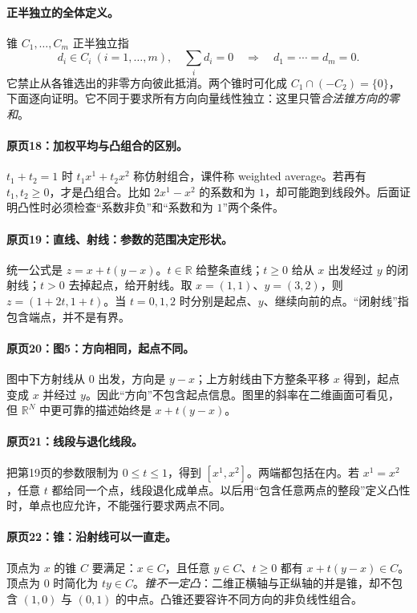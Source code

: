 \documentclass[11pt,a4paper]{article}
\newcommand{\R}{\mathbb{R}}\newcommand{\N}{\mathbb{N}}
\theoremstyle{definition}\newtheorem{definition}{定义}\newtheorem{example}{例}
\begin{document}
\paragraph{正半独立的全体定义。}
锥 $C_1,\ldots,C_m$ 正半独立指
\[d_i\in C_i\ (i=1,\ldots,m),\quad\sum_i d_i=0
\quad\Longrightarrow\quad d_1=\cdots=d_m=0.
\]
它禁止从各锥选出的非零方向彼此抵消。两个锥时可化成 $C_1\cap(-C_2)=\{0\}$，下面逐向证明。它不同于要求所有方向向量线性独立：这里只管\emph{合法锥方向的零和}。


\paragraph{原页18：加权平均与凸组合的区别。}$t_1+t_2=1$ 时 $t_1x^1+t_2x^2$ 称仿射组合，课件称 weighted average。若再有 $t_1,t_2\ge0$，才是凸组合。比如 $2x^1-x^2$ 的系数和为 $1$，却可能跑到线段外。后面证明凸性时必须检查“系数非负”和“系数和为 $1$”两个条件。



\paragraph{原页19：直线、射线：参数的范围决定形状。}统一公式是 $z=x+t(y-x)$。$t\in\R$ 给整条直线；$t\ge0$ 给从 $x$ 出发经过 $y$ 的闭射线；$t>0$ 去掉起点，给开射线。取 $x=(1,1)$、$y=(3,2)$，则 $z=(1+2t,1+t)$。当 $t=0,1,2$ 时分别是起点、$y$、继续向前的点。“闭射线”指包含端点，并不是有界。



\paragraph{原页20：图5：方向相同，起点不同。}图中下方射线从 $0$ 出发，方向是 $y-x$；上方射线由下方整条平移 $x$ 得到，起点变成 $x$ 并经过 $y$。因此“方向”不包含起点信息。图里的斜率在二维画面可看见，但 $\R^N$ 中更可靠的描述始终是 $x+t(y-x)$。



\paragraph{原页21：线段与退化线段。}把第19页的参数限制为 $0\le t\le1$，得到 $[x^1,x^2]$。两端都包括在内。若 $x^1=x^2$，任意 $t$ 都给同一个点，线段退化成单点。以后用“包含任意两点的整段”定义凸性时，单点也应允许，不能强行要求两点不同。



\paragraph{原页22：锥：沿射线可以一直走。}顶点为 $x$ 的锥 $C$ 要满足：$x\in C$，且任意 $y\in C$、$t\ge0$ 都有 $x+t(y-x)\in C$。顶点为 $0$ 时简化为 $t y\in C$。\emph{锥不一定凸}：二维正横轴与正纵轴的并是锥，却不包含 $(1,0)$ 与 $(0,1)$ 的中点。凸锥还要容许不同方向的非负线性组合。
\end{document}
